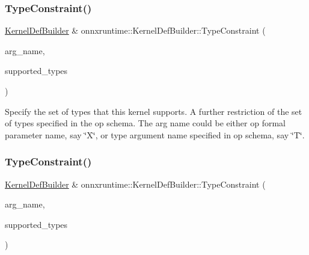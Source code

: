 \subsubsection{\texorpdfstring{Type\+Constraint()}{TypeConstraint()}\hspace{0.1cm}{\footnotesize\ttfamily [1/4]}}
{\footnotesize\ttfamily \mbox{\hyperlink{classonnxruntime_1_1KernelDefBuilder}{Kernel\+Def\+Builder}} \& onnxruntime\+::\+Kernel\+Def\+Builder\+::\+Type\+Constraint (\begin{DoxyParamCaption}\item[{const std\+::string \&}]{arg\+\_\+name,  }\item[{const std\+::vector$<$ \mbox{\hyperlink{namespaceonnxruntime_ad77d0a6e838ec7da5dc35fed5ee66b49}{M\+L\+Data\+Type}} $>$ \&}]{supported\+\_\+types }\end{DoxyParamCaption})}

Specify the set of types that this kernel supports. A further restriction of the set of types specified in the op schema. The arg name could be either op formal parameter name, say \char`\"{}\+X\char`\"{}, or type argument name specified in op schema, say \char`\"{}\+T\char`\"{}. \mbox{\label{classonnxruntime_1_1KernelDefBuilder_af026d3a65a6dcd22355f7b8a37c927ae}} 
\subsubsection{\texorpdfstring{Type\+Constraint()}{TypeConstraint()}\hspace{0.1cm}{\footnotesize\ttfamily [2/4]}}
{\footnotesize\ttfamily \mbox{\hyperlink{classonnxruntime_1_1KernelDefBuilder}{Kernel\+Def\+Builder}} \& onnxruntime\+::\+Kernel\+Def\+Builder\+::\+Type\+Constraint (\begin{DoxyParamCaption}\item[{const char $\ast$}]{arg\+\_\+name,  }\item[{const std\+::vector$<$ \mbox{\hyperlink{namespaceonnxruntime_ad77d0a6e838ec7da5dc35fed5ee66b49}{M\+L\+Data\+Type}} $>$ \&}]{supported\+\_\+types }\end{DoxyParamCaption})}

\mbox{\label{classonnxruntime_1_1KernelDefBuilder_ae4eddf54996695a1c7434e811e42cde2}} 
